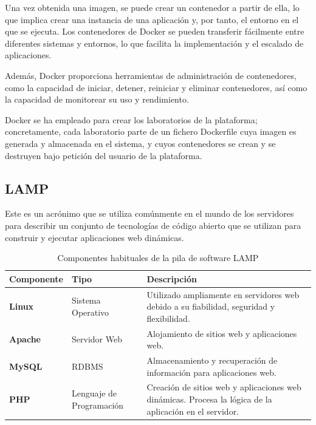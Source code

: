             Una vez obtenida una imagen, se puede crear un contenedor a partir de ella, lo que implica crear una instancia de una aplicación y, por tanto, el entorno en el que se ejecuta. Los contenedores de Docker se pueden transferir fácilmente entre diferentes sistemas y entornos, lo que facilita la implementación y el escalado de aplicaciones.
            
            Además, Docker proporciona herramientas de administración de contenedores, como la capacidad de iniciar, detener, reiniciar y eliminar contenedores, así como la capacidad de monitorear su uso y rendimiento.

            Docker se ha empleado para crear los laboratorios de la plataforma; concretamente, cada laboratorio parte de un fichero Dockerfile cuya imagen es generada y almacenada en el sistema, y cuyos contenedores se crean y se destruyen bajo petición del usuario de la plataforma.
            
            \newpage

        \subsection{LAMP}

            Este es un acrónimo que se utiliza comúnmente en el mundo de los servidores para describir un conjunto de tecnologías de código abierto que se utilizan para construir y ejecutar aplicaciones web dinámicas.

            \begin{table}[!htbp]
                  \centering
                  
                  \begin{tabular}{|>{\centering\arraybackslash}m{3cm}|>{\centering\arraybackslash}m{3cm}|>{\centering\arraybackslash}m{8cm}|}
                        \hline
                        \textbf{Componente} & \textbf{Tipo} & \textbf{Descripción} \\
                        \hline
                        \hline
                        \textbf{Linux} & Sistema Operativo & Utilizado ampliamente en servidores web debido a su fiabilidad, seguridad y flexibilidad. \\
                        \hline
                        \textbf{Apache} & Servidor Web & Alojamiento de sitios web y aplicaciones web. \\
                        \hline
                        \textbf{MySQL} & RDBMS & Almacenamiento y recuperación de información para aplicaciones web. \\
                        \hline
                        \textbf{PHP} & Lenguaje de Programación & Creación de sitios web y aplicaciones web dinámicas. Procesa la lógica de la aplicación en el servidor. \\
                        \hline
                  \end{tabular}

                  \caption{Componentes habituales de la pila de software LAMP}
                  \label{table:lamp}
            \end{table}


